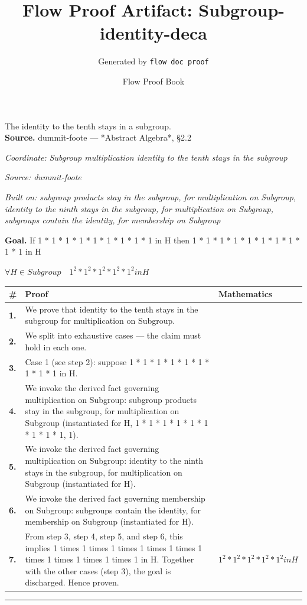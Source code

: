 \documentclass[11pt]{article}
\title{Flow Proof Artifact: Subgroup-identity-deca}
\author{Generated by \texttt{flow doc proof}}
\date{Flow Proof Book}
\theoremstyle{definition}
\begin{document}
\maketitle
The identity to the tenth stays in a subgroup.\\[0.5em]
\textbf{Source.} dummit-foote — *Abstract Algebra*, §2.2\\[0.5em]
\bigskip
{}\par
\smallskip\noindent\textit{Coordinate: Subgroup \cdot multiplication \cdot identity to the tenth stays in the subgroup}\par
\smallskip\noindent\textit{Source: dummit-foote}\par
\smallskip\noindent\textit{Built on: subgroup products stay in the subgroup, for multiplication on Subgroup, identity to the ninth stays in the subgroup, for multiplication on Subgroup, subgroups contain the identity, for membership on Subgroup}\par
\medskip
\noindent\textbf{Goal.} If 1 * 1 * 1 * 1 * 1 * 1 * 1 * 1 * 1 in H then 1 * 1 * 1 * 1 * 1 * 1 * 1 * 1 * 1 * 1 in H\par
\noindent$\displaystyle \forall H \in Subgroup\quad 1^{2} * 1^{2} * 1^{2} * 1^{2} * 1^{2} in H$\par
\medskip
\noindent
\begin{tabular}{@{} >{\raggedright\arraybackslash}p{} >{\raggedright\arraybackslash}p{} >{\raggedleft\arraybackslash}p{} @{}}
\textbf{\#} & \textbf{Proof} & \textbf{Mathematics} \\
\midrule
\textbf{1.} & We prove that identity to the tenth stays in the subgroup for multiplication on Subgroup. & \\[0.45em]
\textbf{2.} & We split into exhaustive cases — the claim must hold in each one. & \\[0.45em]
\textbf{3.} & Case 1 (see step 2): suppose 1 * 1 * 1 * 1 * 1 * 1 * 1 * 1 * 1 in H. & \\[0.45em]
\textbf{4.} & We invoke the derived fact governing multiplication on Subgroup: subgroup products stay in the subgroup, for multiplication on Subgroup (instantiated for H, 1 * 1 * 1 * 1 * 1 * 1 * 1 * 1 * 1, 1). & \\[0.45em]
\textbf{5.} & We invoke the derived fact governing multiplication on Subgroup: identity to the ninth stays in the subgroup, for multiplication on Subgroup (instantiated for H). & \\[0.45em]
\textbf{6.} & We invoke the derived fact governing membership on Subgroup: subgroups contain the identity, for membership on Subgroup (instantiated for H). & \\[0.45em]
\textbf{7.} & From step 3, step 4, step 5, and step 6, this implies 1 times 1 times 1 times 1 times 1 times 1 times 1 times 1 times 1 times 1 in H. Together with the other cases (step 3), the goal is discharged. Hence proven. & $\displaystyle 1^{2} * 1^{2} * 1^{2} * 1^{2} * 1^{2} in H$ \\[0.45em]
\bottomrule
\end{tabular}
\label{thm:Subgroup-multiplication-identity_to_the_tenth_stays_in_the_subgroup}
\par\medskip\hrule
\end{document}
